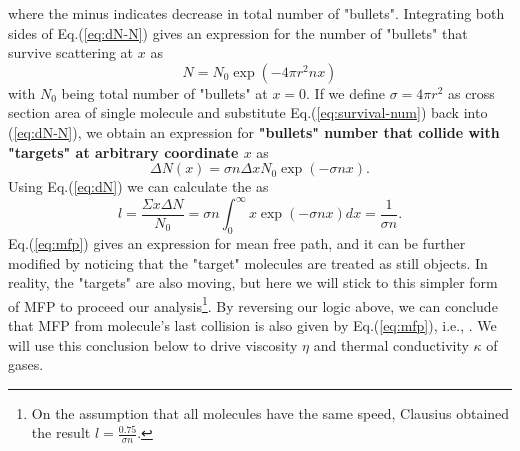 where the minus indicates decrease in total number of "bullets". Integrating both sides of Eq.(\ref{eq:dN-N}) gives an expression for the number of "bullets" that survive scattering at $ x $ as
\begin{equation}
	N = N_0\exp(-4\pi r^2 n x)
	\label{eq:survival-num}
\end{equation}
with $ N_0 $ being total number of "bullets" at $ x=0 $. If we define $ \sigma =  4\pi r^2$ as cross section area of single molecule and substitute Eq.(\ref{eq:survival-num}) back into (\ref{eq:dN-N}), we obtain an expression for \textbf{"bullets" number that collide with "targets" at arbitrary coordinate $ x $} as
\begin{equation}
	\Delta N(x) = \sigma n\Delta x N_0\exp(-\sigma n x).
	\label{eq:dN}
\end{equation}
Using Eq.(\ref{eq:dN}) we can calculate the  as
\begin{equation}
	l = \frac{\Sigma x\Delta N}{N_0} = \sigma n\int_0^{\infty} x\exp(-\sigma n x)dx = \frac{1}{\sigma n}.
	\label{eq:mfp}
\end{equation}
Eq.(\ref{eq:mfp}) gives an expression for mean free path, and it can be further modified by noticing that the "target" molecules are treated as still objects. In reality, the "targets" are also moving, but here we will stick to this simpler form of MFP to proceed our analysis\footnote{On the assumption that all molecules have the same speed, Clausius obtained the result $ l = \frac{0.75}{\sigma n} $.}. By reversing our logic above, we can conclude that MFP from molecule's last collision is also given by Eq.(\ref{eq:mfp}), i.e., . We will use this conclusion below to drive viscosity $ \eta $ and thermal conductivity $ \kappa $ of gases.
